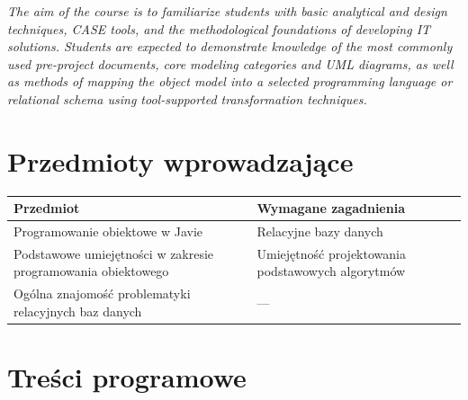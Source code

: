 \documentclass[12pt, a4paper]{article}
\newcommand{\thdrule}{\noalign{\global\setlength{\extrarowheight}{0pt}}}
\newcommand{\thdend}{\noalign{\global\setlength{\extrarowheight}{3pt}}}
\begin{document}
\textit{The aim of the course is to familiarize students with basic analytical and design techniques, CASE tools, and the methodological foundations of developing IT solutions. Students are expected to demonstrate knowledge of the most commonly used pre-project documents, core modeling categories and UML diagrams, as well as methods of mapping the object model into a selected programming language or relational schema using tool-supported transformation techniques.}


\section{Przedmioty wprowadzające}

{\scriptsize
\begin{tabularx}{\textwidth}{m{5cm}Y}
\thdrule\toprule
{} {\color{white}\textbf{Przedmiot}} & {\color{white}\textbf{Wymagane zagadnienia}} \\
\midrule\thdend
   Programowanie obiektowe w Javie & Relacyjne bazy danych \\
   Podstawowe umiejętności w zakresie programowania obiektowego & Umiejętność projektowania podstawowych algorytmów \\
   Ogólna znajomość problematyki relacyjnych baz danych & --- \\
\bottomrule
\end{tabularx}}

\section{Treści programowe}
\end{document}
